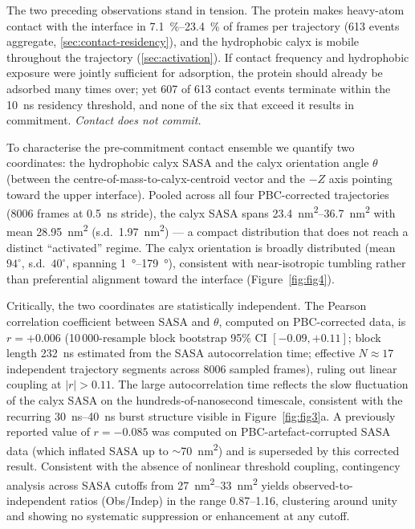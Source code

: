 \documentclass[11pt,a4paper]{article}
\begin{document}
The two preceding observations stand in tension. The protein makes
heavy-atom contact with the interface in
\SIrange{7.1}{23.4}{\percent} of frames per trajectory
(\num{613} events aggregate, \cref{sec:contact-residency}), and the
hydrophobic calyx is mobile throughout the trajectory
(\cref{sec:activation}). If contact frequency and hydrophobic
exposure were jointly sufficient for adsorption, the protein should
already be adsorbed many times over; yet \num{607} of \num{613} contact
events terminate within the \SI{10}{\nano\second} residency threshold,
and none of the six that exceed it results in commitment.
\emph{Contact does not commit.}

To characterise the pre-commitment contact ensemble we quantify two
coordinates: the hydrophobic calyx SASA and the calyx orientation angle
$\theta$ (between the centre-of-mass-to-calyx-centroid vector and the
$-Z$ axis pointing toward the upper interface). Pooled across all four
PBC-corrected trajectories (\num{8006} frames at
\SI{0.5}{\nano\second} stride), the calyx SASA spans
\SIrange{23.4}{36.7}{\nano\metre\squared} with mean
\SI{28.95}{\nano\metre\squared} (s.d.\ \SI{1.97}{\nano\metre\squared})
--- a compact distribution that does not reach a distinct
``activated'' regime. The calyx orientation is broadly distributed
(mean $94^\circ$, s.d.\ $40^\circ$, spanning \SIrange{1}{179}{\degree}), consistent
with near-isotropic tumbling rather than preferential alignment toward
the interface (Figure~\ref{fig:fig4}).

Critically, the two coordinates are statistically independent. The
Pearson correlation coefficient between SASA and $\theta$, computed
on PBC-corrected data, is $r = +0.006$ (10\,000-resample block
bootstrap 95\% CI $[-0.09, +0.11]$; block length \SI{232}{\nano\second}
estimated from the SASA autocorrelation time; effective $N \approx 17$
independent trajectory segments across 8006 sampled frames), ruling
out linear coupling at $|r| > 0.11$. The large autocorrelation time
reflects the slow fluctuation of the calyx SASA on the hundreds-of-nanosecond
timescale, consistent with the recurring \SIrange{30}{40}{\nano\second}
burst structure visible in Figure~\ref{fig:fig3}a. A previously
reported value of $r = -0.085$ was computed on PBC-artefact-corrupted
SASA data (which inflated SASA up to $\sim$\SI{70}{\nano\metre\squared})
and is superseded by this corrected result.
Consistent with the absence of nonlinear threshold coupling, contingency
analysis across SASA cutoffs from \SIrange{27}{33}{\nano\metre\squared}
yields observed-to-independent ratios (Obs/Indep) in the range 0.87--1.16,
clustering around unity and showing no systematic suppression or
enhancement at any cutoff.
\end{document}
